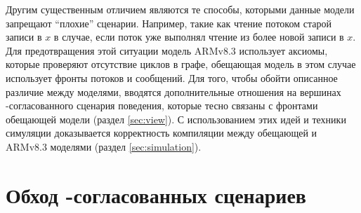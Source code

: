 Другим существенным отличием являются те способы, которыми данные модели запрещают ``плохие'' сценарии.  Например,
такие как чтение потоком старой записи в $x$ в случае, если поток уже выполнял чтение из более новой записи в $x$.
Для предотвращения этой ситуации модель ARMv8.3 использует аксиомы, которые проверяют отсутствие циклов в графе, 
обещающая модель в этом случае использует фронты потоков и сообщений.
Для того, чтобы обойти описанное различие между моделями,
вводятся дополнительные отношения на вершинах \ARM-согласованного сценария поведения,
которые тесно связаны с фронтами обещающей модели (раздел \ref{sec:view}).
С использованием этих идей и техники симуляции
доказывается корректность компиляции между обещающей и ARMv8.3 моделями
(раздел \ref{sec:simulation}).
%

\section{Обход \ARM-согласованных сценариев}
\label{sec:traversal}

